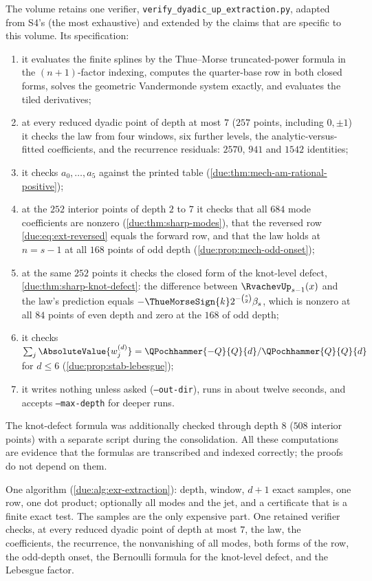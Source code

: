\documentclass[11pt,oneside]{article}
\theoremstyle{plain}
\theoremstyle{definition}
\theoremstyle{remark}
\newcommand{\upn}[1]{\RvachevUp_{#1}}
\newcommand{\Qq}{Q}                                         %
\newcommand{\am}[1]{a_{#1}}                                 %
\newcommand{\Wrow}[2]{w^{(#1)}_{#2}}                        %
\begin{document}
The volume retains one verifier,
\texttt{verify\_\allowbreak dyadic\_\allowbreak up\_\allowbreak extraction.\allowbreak py}, adapted from S4's (the most
exhaustive) and extended by the claims that are specific to this volume.
Its specification:
\begin{enumerate}[label=\textup{(V\arabic*)}]
\item it evaluates the finite splines by the Thue--Morse truncated-power
 formula in the $(n+1)$-factor indexing, computes the quarter-base row in
 both closed forms, solves the geometric Vandermonde system exactly, and
 evaluates the tiled derivatives;
\item at every reduced dyadic point of depth at most $7$ ($257$ points,
 including $0,\pm1$) it checks the law from four windows, six further
 levels, the analytic-versus-fitted coefficients, and the recurrence
 residuals: $2570$, $941$ and $1542$ identities;
\item it checks $\am{0},\ldots,\am{5}$ against the printed table
 (\cref{due:thm:mech-am-rational-positive});
\item at the $252$ interior points of depth $2$ to $7$ it checks that all
 $684$ mode coefficients are nonzero (\cref{due:thm:sharp-modes}), that the
 reversed row \cref{due:eq:ext-reversed} equals the forward row, and that
 the law holds at $n=s-1$ at all $168$ points of odd depth
 (\cref{due:prop:mech-odd-onset});
\item at the same $252$ points it checks the closed form of the knot-level
 defect, \cref{due:thm:sharp-knot-defect}: the difference between
 $\upn{s-1}(x)$ and the law's prediction equals
 $-\ThueMorseSign{k}2^{-\binom s2}\beta_{s}$, which is nonzero at all $84$
 points of even depth and zero at the $168$ of odd depth;
\item it checks $\sum_{j}\AbsoluteValue{\Wrow{d}{j}}=\QPochhammer{-\Qq}{\Qq}{d}/\QPochhammer{\Qq}{\Qq}{d}$
 for $d\le6$ (\cref{due:prop:stab-lebesgue});
\item it writes nothing unless asked (\texttt{--out-dir}), runs in about
 twelve seconds, and accepts \texttt{--max-depth} for deeper runs.
\end{enumerate}
The knot-defect formula was additionally checked through depth $8$ ($508$
interior points) with a separate script during the consolidation.  All
these computations are evidence that the formulas are transcribed and
indexed correctly; the proofs do not depend on them.

\begin{summarybox}[title={Section summary}]
One algorithm (\cref{due:alg:exr-extraction}): depth, window, $d+1$ exact
samples, one row, one dot product; optionally all modes and the jet, and a
certificate that is a finite exact test.  The samples are the only
expensive part.  One retained verifier checks, at every reduced dyadic
point of depth at most $7$, the law, the coefficients, the recurrence, the
nonvanishing of all modes, both forms of the row, the odd-depth onset, the
Bernoulli formula for the knot-level defect, and the Lebesgue factor.
\end{summarybox}
\end{document}
